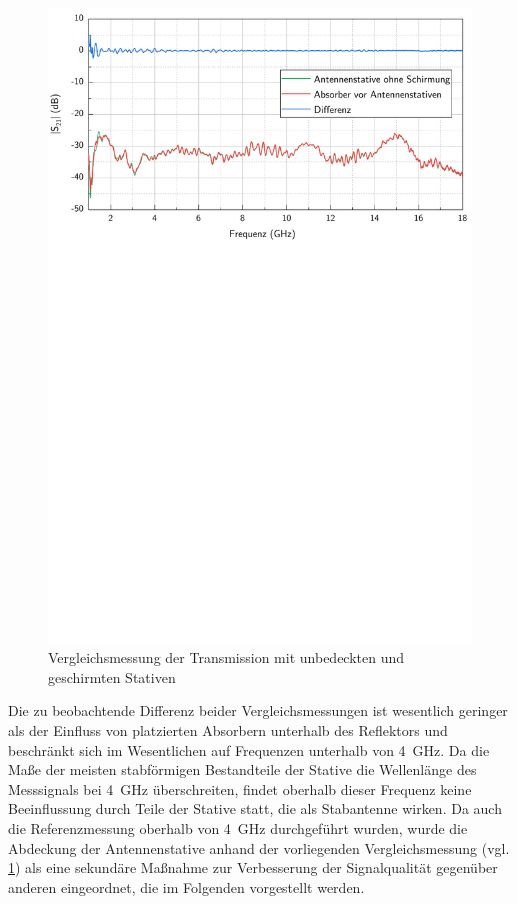 \begin{figure}[ht]
    \centering
    \includegraphics[page=1, width=.99\textwidth, trim = 0cm 15.6cm 0cm 0cm]{Abbildungen/Kapitel4/Messergebnisse/Vergleich Absorber vor Antennenstativen.pdf}
    \caption{Vergleichsmessung der Transmission mit unbedeckten und geschirmten Stativen}
    \label{fig:4_Vergleich_Absorber_vor_Stativen}
\end{figure}


Die zu beobachtende Differenz beider Vergleichsmessungen ist wesentlich geringer als der Einfluss von platzierten Absorbern unterhalb des Reflektors und beschränkt sich im Wesentlichen auf Frequenzen unterhalb von \SI{4}{\giga\hertz}. Da die Maße der meisten stabförmigen Bestandteile der Stative die Wellenlänge des Messsignals bei \SI{4}{\giga\hertz} überschreiten, findet oberhalb dieser Frequenz keine Beeinflussung durch Teile der Stative statt, die als Stabantenne wirken. Da auch die Referenzmessung oberhalb von \SI{4}{\giga\hertz} durchgeführt wurden, wurde die Abdeckung der Antennenstative anhand der vorliegenden Vergleichsmessung (vgl. \Abb\ref{fig:4_Vergleich_Absorber_vor_Stativen}) als eine sekundäre Maßnahme zur Verbesserung der Signalqualität gegenüber anderen eingeordnet, die im Folgenden vorgestellt werden.



